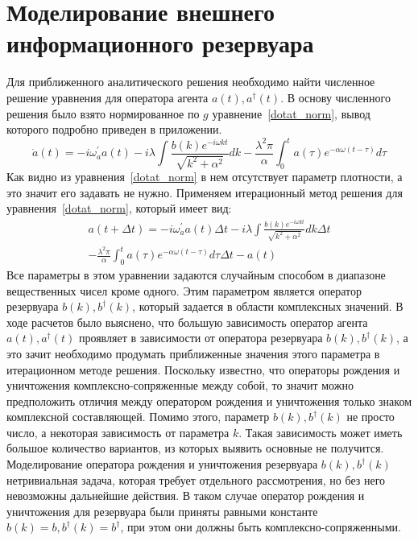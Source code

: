 \section{Моделирование внешнего информационного резервуара}

Для приближенного аналитического решения необходимо найти численное решение уравнения для оператора
агента $a(t), a^{\dagger}(t)$.
В основу численного решения было взято нормированное по $g$ уравнение~\eqref{dotat_norm}, вывод которого
подробно приведен в приложении.
\begin{equation}\label{dotat_norm}
    \dot{a}(t) =
    -i \omega^{'}_{a} a(t)
    -i \lambda \int \frac{b(k)e^{-i \omega k t}}{\sqrt{k^{2} + \alpha^2}} dk
    -\frac{\lambda^{2} \pi}{\alpha} \int_{0}^{t} a(\tau) e^{- \alpha \omega (t - \tau)} d\tau
\end{equation}
Как видно из уравнения~\eqref{dotat_norm} в нем отсутствует параметр плотности, а это значит его
задавать не нужно.
Применяем итерационный метод решения для уравнения~\eqref{dotat_norm}, который имеет вид:
\begin{multline}
    a(t + \Delta t) =
    -i \omega^{'}_{a} a(t) \Delta t
    -i \lambda \int \frac{b(k)e^{-i \omega k t}}{\sqrt{k^{2} + \alpha^2}} dk \Delta t \\
    -\frac{\lambda^{2} \pi}{\alpha} \int_{0}^{t} a(\tau) e^{- \alpha \omega (t - \tau)} d\tau \Delta t
    - a(t)
\end{multline}
Все параметры в этом уравнении задаются случайным способом в диапазоне вещественных чисел кроме одного.
Этим параметром является оператор резервуара $b(k), b^{\dagger}(k)$, который задается в области
комплексных значений.
В ходе расчетов было выяснено, что большую зависимость оператор агента $a(t), a^{\dagger}(t)$ проявляет
в зависимости от оператора резервуара $b(k), b^{\dagger}(k)$, а это зачит необходимо продумать
приближенные значения этого параметра в итерационном методе решения.
Поскольку известно, что операторы рождения и уничтожения комплексно-сопряженные между собой, то значит
можно предположить отличия между оператором рождения и уничтожения только знаком комплексной составляющей.
Помимо этого, параметр $b(k), b^{\dagger}(k)$ не просто число, а некоторая зависимость от параметра $k$.
Такая зависимость может иметь большое количество вариантов, из которых выявить основные не получится.
Моделирование оператора рождения и уничтожения резервуара $b(k), b^{\dagger}(k)$ нетривиальная задача,
которая требует отдельного рассмотрения, но без него невозможны дальнейшие действия.
В таком случае оператор рождения и уничтожения для резервуара были приняты равными константе
$b(k) = b, b^{\dagger}(k) = b^{\dagger}$, при этом они должны быть комплексно-сопряженными.

